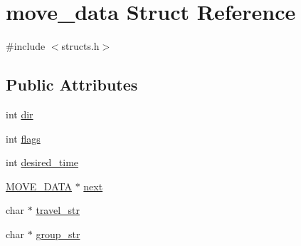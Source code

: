 \hypertarget{structmove__data}{\section{move\-\_\-data Struct Reference}
\label{structmove__data}
}


{\ttfamily \#include $<$structs.\-h$>$}

\subsection*{Public Attributes}
\begin{DoxyCompactItemize}
\item 
int \hyperlink{structmove__data_a11e9cf46d09bdf985b70365e2937efc5}{dir}
\item 
int \hyperlink{structmove__data_aae78dcc287c2ddc1672b4dced5693930}{flags}
\item 
int \hyperlink{structmove__data_a7c41b4b47c38ac031d71ce22514e813d}{desired\-\_\-time}
\item 
\hyperlink{structs_8h_af07de520e38ffdfaf1a55200c024917a}{M\-O\-V\-E\-\_\-\-D\-A\-T\-A} $\ast$ \hyperlink{structmove__data_a6ee2946da58be102d7cd1dd6a8b6b1bf}{next}
\item 
char $\ast$ \hyperlink{structmove__data_a9828ffea5b0502f341fe3bf1f3954108}{travel\-\_\-str}
\item 
char $\ast$ \hyperlink{structmove__data_ae11f708d9b104c9fd04020a47600206f}{group\-\_\-str}
\end{DoxyCompactItemize}


